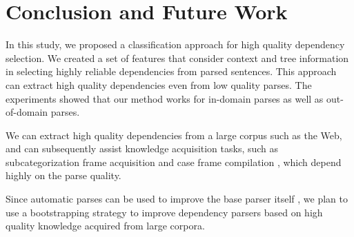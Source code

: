 \documentclass[english]{jnlp_1.4}
\begin{document}
\section{Conclusion and Future Work}\label{conclusion}

In this study, we proposed a classification approach for high quality
dependency selection. We created a set of features that consider context and tree information in selecting highly reliable
dependencies from parsed sentences. This approach can extract high quality dependencies even from low quality parses.
The experiments showed that our method works for in-domain
parses as well as out-of-domain parses. 

We can extract high quality dependencies from a large corpus such as
the Web, and can subsequently assist knowledge acquisition tasks, such as
subcategorization frame acquisition \cite{Korhonen:2006} and case frame compilation \cite{Kawahara:2010}, which depend highly on the parse
quality. 

Since automatic parses can be used to improve the base parser itself \cite{Chen:2009},
we plan to use a bootstrapping strategy to improve dependency parsers based on high quality
knowledge acquired from large corpora.
\end{document}
